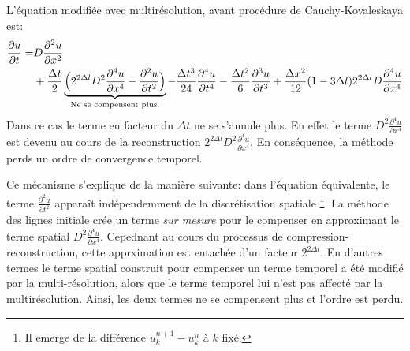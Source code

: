 L'équation modifiée avec multirésolution, avant procédure de Cauchy-Kovaleskaya est:
\begin{align}
    \frac{\partial u}{\partial  t} =&D \frac{\partial^{2} u}{\partial x^{2}}\\\notag
    &+ \frac{\Delta t}{2} \underbrace{\Bigl(2^{2 \Delta l} D^{2}           \frac{\partial^{4} u}{\partial x^{4}} -\frac{\partial^{2} u}{\partial t^{2}} \Bigr)}_{\text{Ne se compensent plus.}}
    -\frac{\Delta t^{3}}{24}                          \frac{\partial^{4} u}{\partial t^{4}} 
    - \frac{\Delta t^{2}}{6}                           \frac{\partial^{3} u}{\partial t^{3}}
    +\frac{\Delta x^{2}}{12} (1 - 3\Delta l)    2^{2 \Delta l} D \frac{\partial^{4} u}{\partial x^{4}}
\end{align}
Dans ce cas le terme en facteur du $\Delta t$ ne se s'annule plus. En effet le terme $D^{2}\frac{\partial^{4} u}{\partial x^{4}}$ est devenu au cours de la reconstruction
$2^{2 \Delta l} D^{2}\frac{\partial^{4} u}{\partial x^{4}}$. En conséquence, la méthode perds un ordre de convergence temporel.\par
Ce mécanisme s'explique de la manière suivante: dans l'équation équivalente, le terme $\frac{\partial^{2} u}{\partial t^{2}}$ apparaît indépendemment de la discrétisation spatiale
\footnote{Il emerge de la différence $u_k^{n+1} - u_k^{n}$ à $k$ fixé.}. La méthode des lignes initiale crée un terme \textit{sur mesure} pour le compenser en approximant le terme spatial
$D^{2}\frac{\partial^{4} u}{\partial x^{4}}$. Cepednant au cours du processus de compression-reconstruction, cette apprximation est entachée d'un facteur $2^{2 \Delta l}$.
En d'autres termes le terme spatial construit pour compenser un terme temporel a été modifié par la multi-résolution, alors que le terme temporel lui n'est pas affecté par la multirésolution.
Ainsi, les deux termes ne se compensent plus et l'ordre est perdu.